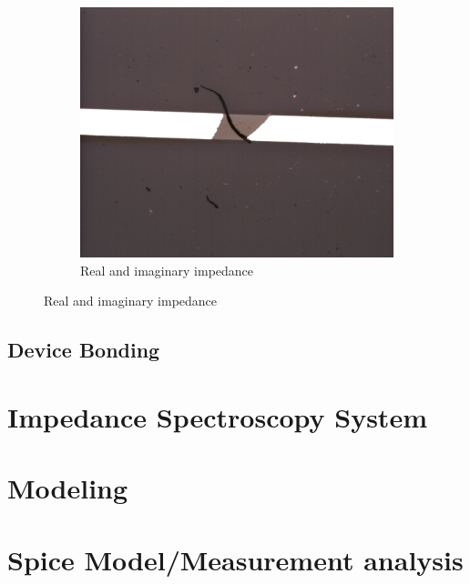 \begin{figure}[h]
\begin{subfigure}[b]{0.45\textwidth}
        \includegraphics[width=\textwidth]{images/electrodeFailureChunkBreakZoomed.png}
        \caption{Real and imaginary impedance}
    \end{subfigure}
\end{figure}


\FloatBarrier

\subsection{Device Bonding}


\section{Impedance Spectroscopy System}


\section{Modeling}


\section{Spice Model/Measurement analysis}